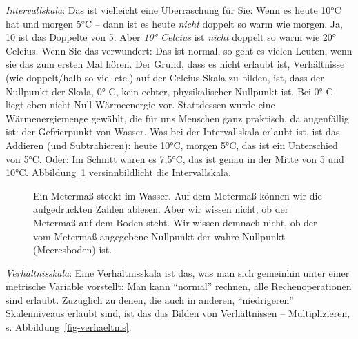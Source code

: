 \documentclass[
  a4paper,
  DIV=11]{scrreprt}
\theoremstyle{definition}
\theoremstyle{definition}
\theoremstyle{definition}
\theoremstyle{remark}
\begin{document}
\emph{Intervallskala}: Das ist vielleicht eine Überraschung für Sie:
Wenn es heute 10°C hat und morgen 5°C -- dann ist es heute \emph{nicht}
doppelt so warm wie morgen. Ja, 10 ist das Doppelte von 5. Aber
\emph{10° Celcius} ist \emph{nicht} doppelt so warm wie 20° Celcius.
Wenn Sie das verwundert: Das ist normal, so geht es vielen Leuten, wenn
sie das zum ersten Mal hören. Der Grund, dass es nicht erlaubt ist,
Verhältnisse (wie doppelt/halb so viel etc.) auf der Celcius-Skala zu
bilden, ist, dass der Nullpunkt der Skala, 0° C, kein echter,
physikalischer Nullpunkt ist. Bei 0° C liegt eben nicht Null
Wärmeenergie vor. Stattdessen wurde eine Wärmenergiemenge gewählt, die
für uns Menschen ganz praktisch, da augenfällig ist: der Gefrierpunkt
von Wasser. Was bei der Intervallskala erlaubt ist, ist das Addieren
(und Subtrahieren): heute 10°C, morgen 5°C, das ist ein Unterschied von
5°C. Oder: Im Schnitt waren es 7,5°C, das ist genau in der Mitte von 5
und 10°C. Abbildung~\ref{fig-intervall} versinnbildlicht die
Intervallskala.

\begin{figure}


\caption{\label{fig-intervall}Ein Metermaß steckt im Wasser. Auf dem
Metermaß können wir die aufgedruckten Zahlen ablesen. Aber wir wissen
nicht, ob der Metermaß auf dem Boden steht. Wir wissen demnach nicht, ob
der vom Metermaß angegebene Nullpunkt der wahre Nullpunkt (Meeresboden)
ist.}

\end{figure}%

\emph{Verhältnisskala}: Eine Verhältnisskala ist das, was man sich
gemeinhin unter einer metrische Variable vorstellt: Man kann ``normal''
rechnen, alle Rechenoperationen sind erlaubt. Zuzüglich zu denen, die
auch in anderen, ``niedrigeren'' Skalenniveaus erlaubt sind, ist das das
Bilden von Verhältnissen -- Multiplizieren, s.
Abbildung~\ref{fig-verhaeltnis}.
\end{document}
